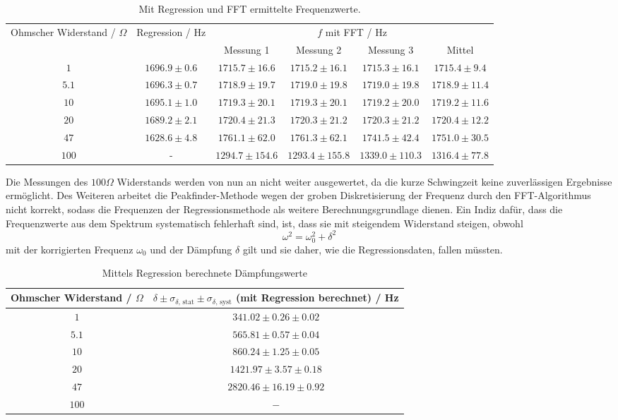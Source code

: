 \documentclass[a4paper, 12pt]{scrartcl}
\begin{document}
\begin{table}[H]
\centering
\begin{adjustbox}{width=\textwidth}
\begin{tabular}{c|c|cccc}
\multirow{2}{*}{Ohmscher Widerstand / $\Omega$} & \multirow{2}{*}{Regression / Hz} & \multicolumn{4}{c}{$f$ mit FFT / Hz} \\
\cline{3-6}
& & Messung 1 & Messung 2 & Messung 3 & Mittel\\
\hline
$1$ & $1696.9 \pm 0.6$ & $1715.7\pm 16.6$ & $1715.2\pm 16.1$ & $1715.3\pm 16.1$ & $1715.4\pm 9.4$\\
$5.1$ & $1696.3 \pm 0.7$ & $1718.9\pm 19.7$ & $1719.0\pm 19.8$ & $1719.0\pm 19.8$ & $1718.9\pm 11.4$\\
$10$ & $1695.1 \pm 1.0$ & $1719.3\pm 20.1$ & $1719.3\pm 20.1$ & $1719.2\pm 20.0$ & $1719.2\pm 11.6$ \\
$20$ & $1689.2 \pm 2.1$ & $1720.4\pm 21.3$ & $1720.3\pm 21.2$ & $1720.3\pm 21.2$ & $1720.4\pm 12.2$\\
$47$ & $1628.6 \pm 4.8$ & $1761.1\pm 62.0$ & $1761.3\pm 62.1$ & $1741.5\pm 42.4$ & $1751.0 \pm 30.5$\\
$100$ & - & $1294.7\pm 154.6$ & $1293.4\pm 155.8$ & $1339.0\pm 110.3$ & $1316.4 \pm 77.8$
\end{tabular}
\end{adjustbox}
\caption{Mit Regression und FFT ermittelte Frequenzwerte.}
\label{tab:freq}
\end{table}

Die Messungen des $100\Omega$ Widerstands werden von nun an nicht weiter ausgewertet, da die kurze Schwingzeit keine zuverlässigen Ergebnisse ermöglicht. Des Weiteren arbeitet die Peakfinder-Methode wegen der groben Diskretisierung der Frequenz durch den FFT-Algorithmus nicht korrekt, sodass die Frequenzen der Regressionsmethode als weitere Berechnungsgrundlage dienen. Ein Indiz dafür, dass die Frequenzwerte aus dem Spektrum systematisch fehlerhaft sind, ist, dass sie mit steigendem Widerstand steigen, obwohl
$$\omega^2 = \omega_0^2 + \delta^2$$
mit der korrigierten Frequenz $\omega_0$ und der Dämpfung $\delta$ gilt und sie daher, wie die Regressionsdaten, fallen müssten.

\begin{table}[h]
\centering
\begin{tabular}{c|c}
Ohmscher Widerstand / $\Omega$ & $\delta \pm \sigma_{\delta\text{, stat}} \pm \sigma_{\delta\text{, syst}}$ (mit Regression berechnet) / Hz \\
\hline
$1$ & $341.02 \pm 0.26 \pm 0.02$ \\
$5.1$ & $565.81 \pm 0.57 \pm 0.04$\\
$10$ & $860.24 \pm 1.25 \pm 0.05$ \\
$20$ & $1421.97 \pm 3.57 \pm 0.18$ \\
$47$ & $2820.46 \pm 16.19 \pm 0.92$\\
$100$ & $-$
\end{tabular}
\caption{Mittels Regression berechnete Dämpfungswerte}
\label{tab:daempfung1}
\end{table}
\end{document}
